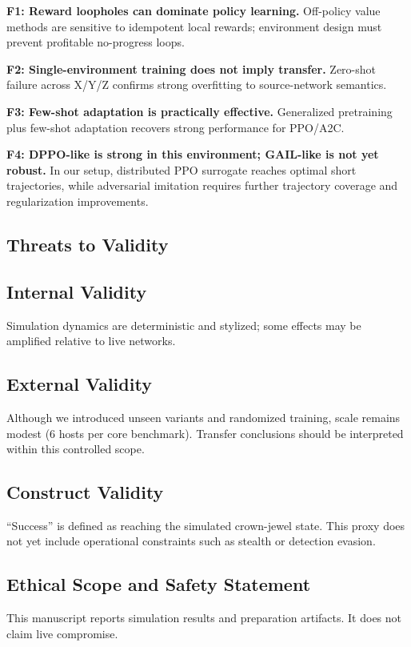 \documentclass[conference]{IEEEtran}
\begin{document}
\textbf{F1: Reward loopholes can dominate policy learning.}
Off-policy value methods are sensitive to idempotent local rewards; environment design must prevent profitable no-progress loops.

\textbf{F2: Single-environment training does not imply transfer.}
Zero-shot failure across X/Y/Z confirms strong overfitting to source-network semantics.

\textbf{F3: Few-shot adaptation is practically effective.}
Generalized pretraining plus few-shot adaptation recovers strong performance for PPO/A2C.

\textbf{F4: DPPO-like is strong in this environment; GAIL-like is not yet robust.}
In our setup, distributed PPO surrogate reaches optimal short trajectories, while adversarial imitation requires further trajectory coverage and regularization improvements.

\subsection{Threats to Validity}
\subsection{Internal Validity}
Simulation dynamics are deterministic and stylized; some effects may be amplified relative to live networks.

\subsection{External Validity}
Although we introduced unseen variants and randomized training, scale remains modest (6 hosts per core benchmark). Transfer conclusions should be interpreted within this controlled scope.

\subsection{Construct Validity}
``Success'' is defined as reaching the simulated crown-jewel state. This proxy does not yet include operational constraints such as stealth or detection evasion.

\subsection{Ethical Scope and Safety Statement}
This manuscript reports simulation results and preparation artifacts. It does not claim live compromise.
\end{document}
